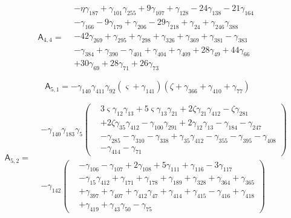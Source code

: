 \[\mathsf A_{4,4}=\begin{aligned}&- \eta  \gamma_{187}+ \gamma_{101} \gamma_{255}+ 9 \gamma_{107}+ \gamma_{128}- 24 \gamma_{138}- 21 \gamma_{164}\\&- \gamma_{166}- 9 \gamma_{179}+ \gamma_{206}- 29 \gamma_{218}+ \gamma_{24}+ \gamma_{246} \gamma_{388}\\&- 42 \gamma_{269}+ \gamma_{295}+ \gamma_{298}+ \gamma_{326}+ \gamma_{369}+ \gamma_{381}- \gamma_{383}\\&- \gamma_{384}+ \gamma_{390}- \gamma_{401}+ \gamma_{404}+ \gamma_{409}+ 28 \gamma_{49}+ 44 \gamma_{66}\\&+ 30 \gamma_{69}+ 28 \gamma_{71}+ 26 \gamma_{73}\end{aligned}\]

\[\mathsf A_{5,1}=- \gamma_{140} \gamma_{411} \gamma_{92} \left(\varsigma  + \gamma_{141}\right) \left(\zeta  + \gamma_{366} + \gamma_{410} + \gamma_{77}\right)\]

\[\mathsf A_{5,2}=\begin{aligned}&- \gamma_{140} \gamma_{183} \gamma_{5} \left(\begin{aligned}& 3 \varsigma  \gamma_{12} \gamma_{13}+ 5 \varsigma  \gamma_{13} \gamma_{21}+ 2 \zeta  \gamma_{21} \gamma_{412}- \zeta  \gamma_{281}\\&+ 2 \zeta  \gamma_{35} \gamma_{412}- \gamma_{100} \gamma_{291}+ 2 \gamma_{12} \gamma_{13}- \gamma_{184}- \gamma_{247}\\&- \gamma_{285}- \gamma_{310}- \gamma_{338}+ \gamma_{35} \gamma_{412}- \gamma_{355}- \gamma_{395}- \gamma_{408}\\&- \gamma_{414}- \gamma_{71}\end{aligned}\right)\\&- \gamma_{142} \left(\begin{aligned}&- \gamma_{106}- \gamma_{107}+ 2 \gamma_{108}+ 5 \gamma_{111}+ \gamma_{116}- 3 \gamma_{117}\\&- \gamma_{15} \gamma_{412}+ \gamma_{171}+ \gamma_{178}+ \gamma_{189}+ \gamma_{328}+ \gamma_{364}+ \gamma_{365}\\&+ \gamma_{397}+ \gamma_{407}+ \gamma_{412} \gamma_{47}+ \gamma_{414}+ \gamma_{415}- \gamma_{416}+ \gamma_{418}\\&+ \gamma_{419}+ \gamma_{43} \gamma_{50}- \gamma_{75}\end{aligned}\right)\end{aligned}\]

